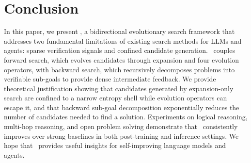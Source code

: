 \section{Conclusion}

In this paper, we present \ours, a bidirectional evolutionary search framework that addresses two fundamental limitations of existing search methods for LLMs and agents: sparse verification signals and confined candidate generation. \ours\ couples forward search, which evolves candidates through expansion and four evolution operators, with backward search, which recursively decomposes problems into verifiable sub-goals to provide dense intermediate feedback. We provide theoretical justification showing that candidates generated by expansion-only search are confined to a narrow entropy shell while evolution operators can escape it, and that backward sub-goal decomposition exponentially reduces the number of candidates needed to find a solution. Experiments on logical reasoning, multi-hop reasoning, and open problem solving demonstrate that \ours\ consistently improves over strong baselines in both post-training and inference settings. We hope that \ours\ provides useful insights for self-improving language models and agents.